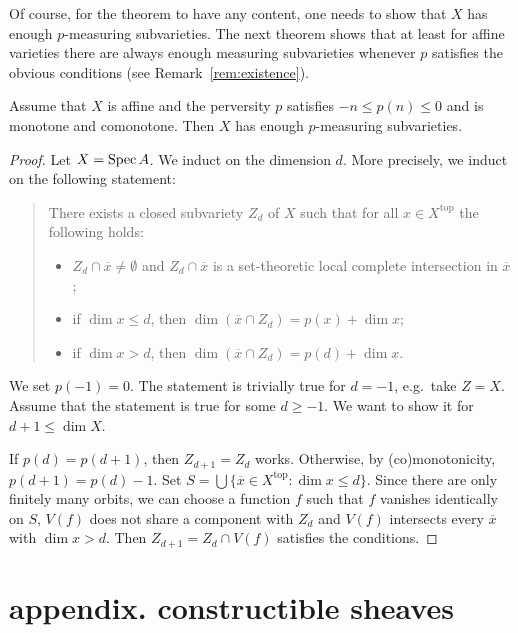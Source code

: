 \documentclass[english,biblatex-alpha,bw]{short-notes}
\begin{document}
Of course, for the theorem to have any content, one needs to show that $X$ has enough $p$-measuring subvarieties.
The next theorem shows that at least for affine varieties there are always enough measuring subvarieties whenever $p$ satisfies the obvious conditions (see Remark~\ref{rem:existence}).

\begin{Thm}\label{thm:existance}%
    Assume that $X$ is affine and the perversity $p$ satisfies $-n \le p(n) \le 0$ and is monotone and comonotone.
    Then $X$ has enough $p$-measuring subvarieties.
\end{Thm}

\begin{proof}
    Let $X = \operatorname{Spec} A$.
    We induct on the dimension $d$.
    More precisely, we induct on the following statement:
    \begin{quote}
        There exists a closed subvariety $Z_d$ of $X$ such that for all $x ∈ X^{\mathrm{top}}$ the following holds:
        \begin{itemize}
            \item $Z_d \cap \overline x \ne \emptyset$ and $Z_d \cap \overline x$ is a set-theoretic local complete intersection in $\overline x$;
            \item if $\dim x \le d$, then $\dim(\overline x ∩ Z_d) = p(x) + \dim x$;
            \item if $\dim x > d$, then $\dim(\overline x ∩ Z_d) = p(d) + \dim x$.
        \end{itemize}
    \end{quote}
    We set $p(-1) = 0$.
    The statement is trivially true for $d = -1$, e.g.~take $Z = X$.
    Assume that the statement is true for some $d \ge -1$.
    We want to show it for $d+1 \le \dim X$.

    If $p(d) = p(d+1)$, then $Z_{d+1} = Z_{d}$ works.
    Otherwise, by (co)monotonicity, $p(d+1) = p(d) - 1$.
    Set $S = \bigcup \{ \overline x ∈ X^{\mathrm{top}} : \dim x \le d\}$.
    Since there are only finitely many orbits, we can choose a function $f$ such that $f$ vanishes identically on $S$, $V(f)$ does not share a component with $Z_d$ and $V(f)$ intersects every $\overline x$ with $\dim x > d$.
    Then $Z_{d+1} = Z_d \cap V(f)$ satisfies the conditions.
\end{proof}

\appendix

\section*{appendix. constructible sheaves}
\end{document}
